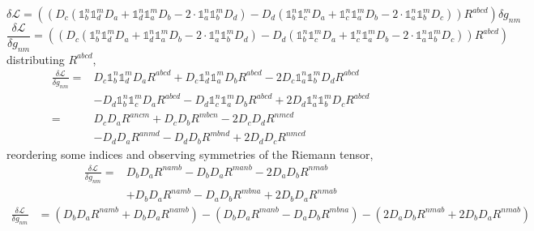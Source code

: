 \documentclass[aps,prd,preprint]{revtex4-1}
\begin{document}
\begin{fleqn}
\begin{equation*}
    \delta \mathcal{L} = \left( \left( D_c (\mathds{1}^n_b \mathds{1}^m_d D_a + \mathds{1}^n_d \mathds{1}^m_a D_b - 2 \cdot \mathds{1}^n_a \mathds{1}^m_b D_d) - D_d (\mathds{1}^n_b \mathds{1}^m_c D_a + \mathds{1}^n_c \mathds{1}^m_a D_b - 2 \cdot \mathds{1}^n_a \mathds{1}^m_b D_c) \right) R^{abcd} \right) \delta g_{nm}
\end{equation*}
\begin{equation*}
    \frac{\delta \mathcal{L}}{\delta g_{nm}} = \left( \left( D_c (\mathds{1}^n_b \mathds{1}^m_d D_a + \mathds{1}^n_d \mathds{1}^m_a D_b - 2 \cdot \mathds{1}^n_a \mathds{1}^m_b D_d) - D_d (\mathds{1}^n_b \mathds{1}^m_c D_a + \mathds{1}^n_c \mathds{1}^m_a D_b - 2 \cdot \mathds{1}^n_a \mathds{1}^m_b D_c) \right) R^{abcd} \right)
\end{equation*}
distributing $R^{abcd}$,
\begin{equation*}
\begin{aligned}
    \frac{\delta \mathcal{L}}{\delta g_{nm}} = &D_c \mathds{1}^n_b \mathds{1}^m_d D_a R^{abcd} + D_c \mathds{1}^n_d \mathds{1}^m_a D_b R^{abcd} - 2 D_c \mathds{1}^n_a \mathds{1}^m_b D_d R^{abcd} \\
    &- D_d \mathds{1}^n_b \mathds{1}^m_c D_a R^{abcd} - D_d \mathds{1}^n_c \mathds{1}^m_a D_b R^{abcd} + 2 D_d \mathds{1}^n_a \mathds{1}^m_b D_c R^{abcd} \\
    = &D_c D_a R^{ancm} + D_c D_b R^{mbcn} - 2 D_c D_d R^{nmcd} \\
    &- D_d D_a R^{anmd} - D_d D_b R^{mbnd} + 2 D_d D_c R^{nmcd}
\end{aligned}
\end{equation*}
reordering some indices and observing symmetries of the Riemann tensor,
\begin{equation*}
\begin{aligned}
    \frac{\delta \mathcal{L}}{\delta g_{nm}} = &D_b D_a R^{namb} - D_b D_a R^{manb} - 2 D_a D_b R^{nmab} \\
    &+ D_b D_a R^{namb} - D_a D_b R^{mbna} + 2 D_b D_a R^{nmab}
\end{aligned}
\end{equation*}
\begin{equation*}
\begin{aligned}
    \frac{\delta \mathcal{L}}{\delta g_{nm}} &=
    \left( D_b D_a R^{namb} + D_b D_a R^{namb} \right)
    - \left( D_b D_a R^{manb}  - D_a D_b R^{mbna}\right)
    - \left( 2 D_a D_b R^{nmab} + 2 D_b D_a R^{nmab} \right) \\

\end{aligned}
\end{equation*}
\end{fleqn}
\end{document}
